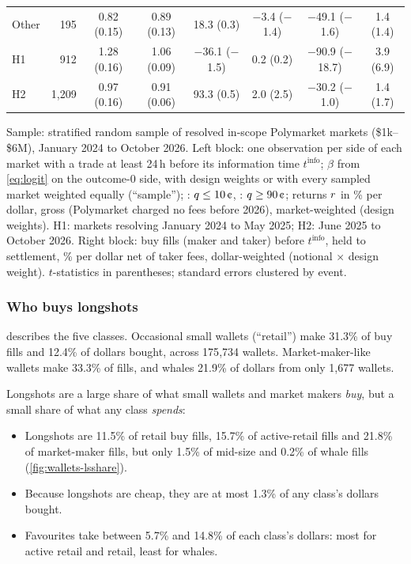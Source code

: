 \begin{table}[t]
\begin{threeparttable}
\begin{tabular}{lrcccccc}
Other & 195 & 0.82 (0.15) & 0.89 (0.13) & 18.3 (0.3) & $-$3.4 ($-$1.4) & $-$49.1 ($-$1.6) & 1.4 (1.4) \\
\addlinespace
H1 & 912 & 1.28 (0.16) & 1.06 (0.09) & $-$36.1 ($-$1.5) & 0.2 (0.2) & $-$90.9 ($-$18.7) & 3.9 (6.9) \\
H2 & 1{,}209 & 0.97 (0.16) & 0.91 (0.06) & 93.3 (0.5) & 2.0 (2.5) & $-$30.2 ($-$1.0) & 1.4 (1.7) \\
\bottomrule
\end{tabular}
\begin{tablenotes}\footnotesize
\item Sample: stratified random sample of resolved in-scope Polymarket markets (\$1k--\$6M), January 2024
  to October 2026. Left block: one observation per side of each market with a trade at least 24\,h before
  its information time $t^{\mathrm{info}}$; $\beta$ from \eqref{eq:logit} on the outcome-0 side, with design
  weights or with every sampled market weighted equally (``sample''); \LS: $\q\le10\cents$, \FAV: $\q\ge90\cents$; returns
  $r$ in \% per dollar, gross (Polymarket charged no fees before 2026), market-weighted (design weights).
  H1: markets resolving January 2024 to May 2025; H2: June 2025 to October 2026.
  Right block: buy fills (maker and taker) before $t^{\mathrm{info}}$, held to settlement, \% per dollar
  net of taker fees, dollar-weighted (notional $\times$ design weight). $t$-statistics in parentheses;
  standard errors clustered by event.
\end{tablenotes}
\end{threeparttable}
\end{table}

\subsubsection{Who buys longshots}\label{sec:res-wallets-who}

 describes the five classes. Occasional small wallets (``retail'') make
31.3\% of buy fills and 12.4\% of dollars bought, across 175{,}734 wallets.
Market-maker-like wallets make 33.3\% of fills, and whales 21.9\% of dollars from only
1{,}677 wallets.

Longshots are a large share of what small wallets and market makers \emph{buy}, but a small share of what
any class \emph{spends}:
\begin{itemize}
  \item Longshots are 11.5\% of retail buy fills, 15.7\% of active-retail fills and 21.8\% of
    market-maker fills, but only 1.5\% of mid-size and 0.2\% of whale fills
    (\cref{fig:wallets-lsshare}).
  \item Because longshots are cheap, they are at most 1.3\% of any
    class's dollars bought.
  \item Favourites take between 5.7\% and
    14.8\% of each class's dollars: most for
    active retail and retail, least for whales.
\end{itemize}

